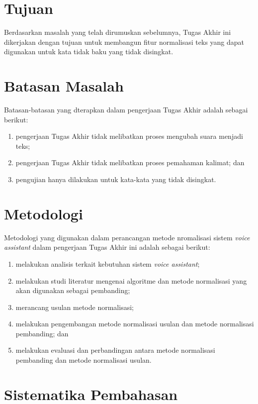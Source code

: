 \section{Tujuan}

Berdasarkan masalah yang telah dirumuskan sebelumnya, Tugas Akhir ini dikerjakan dengan tujuan untuk membangun fitur normalisasi teks yang dapat digunakan untuk kata tidak baku yang tidak disingkat.

\section{Batasan Masalah}

Batasan-batasan yang dterapkan dalam pengerjaan Tugas Akhir adalah sebagai berikut:

\begin{enumerate}
	\item pengerjaan Tugas Akhir tidak melibatkan proses mengubah suara menjadi teks;
	\item pengerjaan Tugas Akhir tidak melibatkan proses pemahaman kalimat; dan
	\item pengujian hanya dilakukan untuk kata-kata yang tidak disingkat.
\end{enumerate}

\section{Metodologi}

Metodologi yang digunakan dalam perancangan metode nromalisasi sistem \textit{voice assistant} dalam pengerjaan Tugas Akhir ini adalah sebagai berikut:

\begin{enumerate}
	\item melakukan analisis terkait kebutuhan sistem \textit{voice assistant};
	\item melakukan studi literatur mengenai algoritme dan metode normalisasi yang akan digunakan sebagai pembanding;
	\item merancang usulan metode normalisasi;
	\item melakukan pengembangan metode normalisasi usulan dan metode normalisasi pembanding; dan
	\item melakukan evaluasi dan perbandingan antara metode normalisasi pembanding dan metode normalisasi usulan. 
\end{enumerate}

\section{Sistematika Pembahasan}

